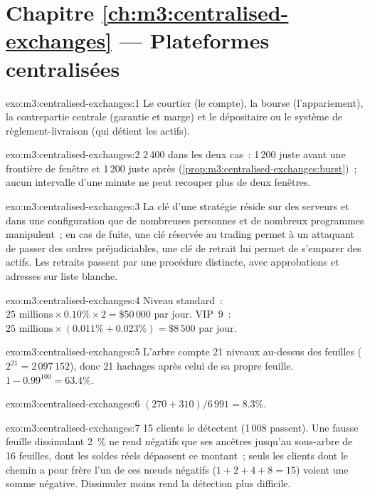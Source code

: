 \section*{Chapitre \ref{ch:m3:centralised-exchanges} --- Plateformes centralisées}

\begin{solution}{exo:m3:centralised-exchanges:1}
Le courtier (le compte), la bourse (l'appariement), la contrepartie centrale (garantie et marge) et
le dépositaire ou le système de règlement-livraison (qui détient les actifs).
\end{solution}

\begin{solution}{exo:m3:centralised-exchanges:2}
2\,400 dans les deux cas~: 1\,200 juste avant une frontière de fenêtre et 1\,200 juste après
(\cref{prop:m3:centralised-exchanges:burst})~; aucun intervalle d'une minute ne peut recouper plus de deux fenêtres.
\end{solution}

\begin{solution}{exo:m3:centralised-exchanges:3}
La clé d'une stratégie réside sur des serveurs et dans une configuration que de nombreuses personnes et de nombreux programmes manipulent~; en cas de fuite,
une clé réservée au trading permet à un attaquant de passer des ordres préjudiciables, une clé de retrait lui permet de s'emparer des actifs. Les retraits passent
par une procédure distincte, avec approbations et adresses sur liste blanche.
\end{solution}

\begin{solution}{exo:m3:centralised-exchanges:4}
Niveau standard~: $25\text{ millions} \times 0.10\% \times 2 = \$50\,000$ par jour. VIP~9~: $25\text{ millions} \times
(0.011\% + 0.023\%) = \$8\,500$ par jour.
\end{solution}

\begin{solution}{exo:m3:centralised-exchanges:5}
L'arbre compte 21 niveaux au-dessus des feuilles ($2^{21} = 2\,097\,152$), donc 21 hachages après celui de sa propre feuille.
$1 - 0.99^{100} = 63.4\%$.
\end{solution}

\begin{solution}{exo:m3:centralised-exchanges:6}
$(270 + 310)/6\,991 = 8.3\%$.
\end{solution}

\begin{solution}{exo:m3:centralised-exchanges:7}
15 clients le détectent (1\,008 passent). Une fausse feuille dissimulant 2~\% ne rend négatifs que ses ancêtres jusqu'au
sous-arbre de 16 feuilles, dont les soldes réels dépassent ce montant~; seuls les clients dont le chemin a pour frère l'un de ces nœuds
négatifs ($1 + 2 + 4 + 8 = 15$) voient une somme négative. Dissimuler moins rend la détection plus difficile.
\end{solution}

